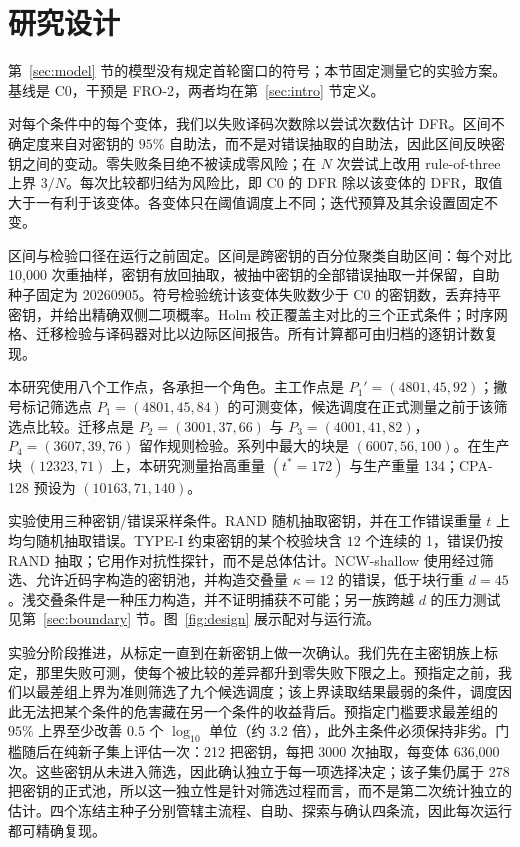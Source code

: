 \section{研究设计}\label{sec:method}

第~\ref{sec:model} 节的模型没有规定首轮窗口的符号；本节固定测量它的实验方案。基线是 C0，干预是 FRO-2，两者均在第~\ref{sec:intro} 节定义。

对每个条件中的每个变体，我们以失败译码次数除以尝试次数估计 DFR。区间不确定度来自对密钥的 $95\%$ 自助法，而不是对错误抽取的自助法，因此区间反映密钥之间的变动。零失败条目绝不被读成零风险；在 $N$ 次尝试上改用 rule-of-three 上界 $3/N$。每次比较都归结为风险比，即 C0 的 DFR 除以该变体的 DFR，取值大于一有利于该变体。各变体只在阈值调度上不同；迭代预算及其余设置固定不变。

区间与检验口径在运行之前固定。区间是跨密钥的百分位聚类自助区间：每个对比 10{,}000 次重抽样，密钥有放回抽取，被抽中密钥的全部错误抽取一并保留，自助种子固定为 20260905。符号检验统计该变体失败数少于 C0 的密钥数，丢弃持平密钥，并给出精确双侧二项概率。Holm 校正覆盖主对比的三个正式条件；时序网格、迁移检验与译码器对比以边际区间报告。所有计算都可由归档的逐钥计数复现。

本研究使用八个工作点，各承担一个角色。主工作点是 $P_1'=(4801,45,92)$；撇号标记筛选点 $P_1=(4801,45,84)$ 的可测变体，候选调度在正式测量之前于该筛选点比较。迁移点是 $P_2=(3001,37,66)$ 与 $P_3=(4001,41,82)$，$P_4=(3607,39,76)$ 留作规则检验。系列中最大的块是 $(6007,56,100)$。在生产块 $(12323,71)$ 上，本研究测量抬高重量 $(t^{\ast}=172)$ 与生产重量 134；CPA-128 预设为 $(10163,71,140)$。

实验使用三种密钥/错误采样条件。RAND 随机抽取密钥，并在工作错误重量 $t$ 上均匀随机抽取错误。TYPE-I 约束密钥的某个校验块含 $12$ 个连续的 1，错误仍按 RAND 抽取；它用作对抗性探针，而不是总体估计。NCW-shallow 使用经过筛选、允许近码字构造的密钥池，并构造交叠量 $\kappa=12$ 的错误，低于块行重 $d=45$。浅交叠条件是一种压力构造，并不证明捕获不可能；另一族跨越 $d$ 的压力测试见第~\ref{sec:boundary} 节。图~\ref{fig:design} 展示配对与运行流。

实验分阶段推进，从标定一直到在新密钥上做一次确认。我们先在主密钥族上标定，那里失败可测，使每个被比较的差异都升到零失败下限之上。预指定之前，我们以最差组上界为准则筛选了九个候选调度；该上界读取结果最弱的条件，调度因此无法把某个条件的危害藏在另一个条件的收益背后。预指定门槛要求最差组的 $95\%$ 上界至少改善 $0.5$ 个 $\log_{10}$ 单位（约 3.2 倍），此外主条件必须保持非劣。门槛随后在纯新子集上评估一次：212 把密钥，每把 3000 次抽取，每变体 636{,}000 次。这些密钥从未进入筛选，因此确认独立于每一项选择决定；该子集仍属于 278 把密钥的正式池，所以这一独立性是针对筛选过程而言，而不是第二次统计独立的估计。四个冻结主种子分别管辖主流程、自助、探索与确认四条流，因此每次运行都可精确复现。

